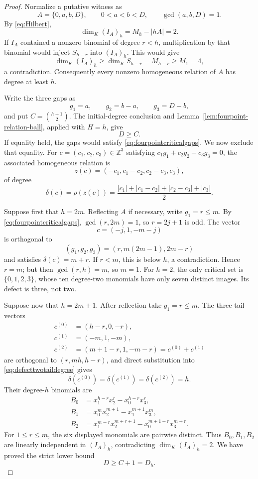 \documentclass[10pt,a4paper]{amsart}
\newcommand{\Z}{\mathbb Z}
\begin{document}
\begin{proof}
Normalize a putative witness as
\[
 A=\{0,a,b,D\},\qquad 0<a<b<D,\qquad \gcd(a,b,D)=1.
\]
By \eqref{eq:Hilbert},
\[
 \dim_K(I_A)_h=M_h-|hA|=2.
\]
If $I_A$ contained a nonzero binomial of degree $r<h$, multiplication by
that binomial would inject $S_{h-r}$ into $(I_A)_h$.  This would give
\[
 \dim_K(I_A)_h\geq \dim_K S_{h-r}=M_{h-r}\geq M_1=4,
\]
a contradiction.  Consequently every nonzero homogeneous relation of $A$
has degree at least $h$.

Write the three gaps as
\[
 g_1=a,\qquad g_2=b-a,\qquad g_3=D-b,
\]
and put $C=\binom{h+1}{2}$.  The initial-degree conclusion and
Lemma~\ref{lem:fourpoint-relation-ball}, applied with $H=h$, give
\[
 D\geq C.
\]
If equality held, the gaps would satisfy
\eqref{eq:fourpointcriticalgaps}.  We now exclude that equality.
For $c=(c_1,c_2,c_3)\in\Z^3$ satisfying
$c_1g_1+c_2g_2+c_3g_3=0$, the associated homogeneous relation is
\[
 z(c)=(-c_1,c_1-c_2,c_2-c_3,c_3),
\]
of degree
\begin{equation}\label{eq:defecttwotaildegree}
 \delta(c)=\rho(z(c))=
 \frac{|c_1|+|c_1-c_2|+|c_2-c_3|+|c_3|}{2}.
\end{equation}

Suppose first that $h=2m$.  Reflecting $A$ if necessary, write
$g_1=r\leq m$.  By \eqref{eq:fourpointcriticalgaps},
$\gcd(r,2m)=1$, so $r=2j+1$ is odd.  The vector
\[
 c=(-j,1,-m-j)
\]
is orthogonal to
\[
 (g_1,g_2,g_3)=(r,m(2m-1),2m-r)
\]
and satisfies $\delta(c)=m+r$.  If $r<m$, this is below $h$, a
contradiction.  Hence $r=m$; but then $\gcd(r,h)=m$, so $m=1$.
For $h=2$, the only critical set is $\{0,1,2,3\}$, whose ten degree-two
monomials have only seven distinct images.  Its defect is three, not two.

Suppose now that $h=2m+1$.  After reflection take $g_1=r\leq m$.
The three tail vectors
\[
 \begin{aligned}
 c^{(0)}&=(h-r,0,-r),\\
 c^{(1)}&=(-m,1,-m),\\
 c^{(2)}&=(m+1-r,1,-m-r)=c^{(0)}+c^{(1)}
 \end{aligned}
\]
are orthogonal to $(r,mh,h-r)$, and direct substitution into
\eqref{eq:defecttwotaildegree} gives
\[
 \delta(c^{(0)})=\delta(c^{(1)})=\delta(c^{(2)})=h.
\]
Their degree-$h$ binomials are
\[
 \begin{aligned}
 B_0&=x_1^{h-r}x_2^r-x_0^{h-r}x_3^r,\\
 B_1&=x_0^m x_2^{m+1}-x_1^{m+1}x_3^m,\\
 B_2&=x_1^{m-r}x_2^{m+r+1}
      -x_0^{m+1-r}x_3^{m+r}.
 \end{aligned}
\]
For $1\leq r\leq m$, the six displayed monomials are pairwise distinct.
Thus $B_0,B_1,B_2$ are linearly independent in $(I_A)_h$, contradicting
$\dim_K(I_A)_h=2$.  We have proved the strict lower bound
\begin{equation}\label{eq:defecttwolower}
 D\geq C+1=D_h.
\end{equation}


\end{proof}
\end{document}
